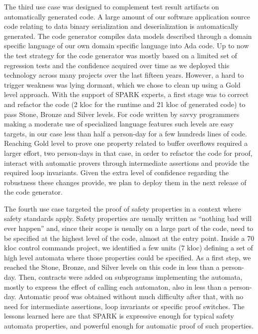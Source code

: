 \documentclass{llncs}
\begin{document}
The third use case was designed to complement test result artifacts on
automatically generated code. A large amount of our software application source
code relating to data binary serialization and deserialization is automatically
generated. The code generator compiles data models described through a domain
specific language of our own domain specific language into Ada code. Up to now
the test strategy for the code generator was mostly based on a limited set of
regression tests and the confidence acquired over time as we deployed this
technology across many projects over the last fifteen years. However, a hard to
trigger weakness was lying dormant, which we chose to clean up using a Gold
level approach. With the support of SPARK experts, a first stage was to correct
and refactor the code (2 kloc for the runtime and 21 kloc of generated code) to
pass Stone, Bronze and Silver levels. For code written by savvy programmers
making a moderate use of specialized language features such levels are easy
targets, in our case less than half a person-day for a few hundreds lines of
code. Reaching Gold level to prove one property related to buffer overflows
required a larger effort, two person-days in that case, in order to refactor
the code for proof, interact with automatic provers through intermediate
assertions and provide the required loop invariants. Given the extra level of
confidence regarding the robustness these changes provide, we plan to deploy
them in the next release of the code generator.

The fourth use case targeted the proof of safety properties in a context where
safety standards apply. Safety properties are usually written as “nothing bad
will ever happen” and, since their scope is usually on a large part of the
code, need to be specified at the highest level of the code, almost at the
entry point. Inside a 70 kloc control commands project, we identified a few
units (7 kloc) defining a set of high level automata where those properties
could be specified.  As a first step, we reached the Stone, Bronze, and Silver
levels on this code in less than a person-day. Then, contracts were added on
subprograms implementing the automata, mostly to express the effect of calling
each automaton, also in less than a person-day. Automatic proof was obtained
without much difficulty after that, with no need for intermediate assertions,
loop invariants or specific proof switches. The lessons learned here are that
SPARK is expressive enough for typical safety automata properties, and powerful
enough for automatic proof of such properties.
\end{document}

